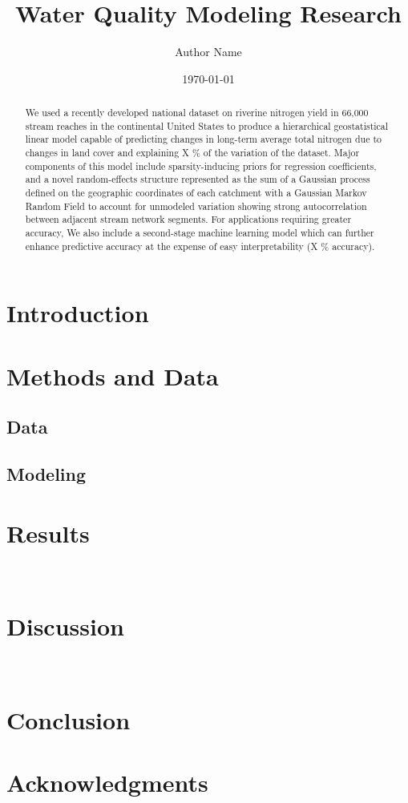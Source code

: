 \documentclass[12pt,letterpaper]{article}
\title{Water Quality Modeling Research}
\author{Author Name}
\date{\today}
\begin{document}
\maketitle

\begin{abstract}
    We used a recently developed national dataset on riverine nitrogen yield in 66,000 stream reaches in the continental United States to produce a hierarchical geostatistical linear model capable of predicting changes in long-term average total nitrogen due to changes in land cover and explaining X \% of the variation of the dataset. Major components of this model include sparsity-inducing priors for regression coefficients, and a novel random-effects structure represented as the sum of a Gaussian process defined on the geographic coordinates of each catchment with a Gaussian Markov Random Field to account for unmodeled variation showing strong autocorrelation between adjacent stream network segments. For applications requiring greater accuracy, We also include a second-stage machine learning model which can further enhance predictive accuracy at the expense of easy interpretability (X \% accuracy). 
\end{abstract}

\section{Introduction}
\label{sec:introduction}

\section{Methods and Data}
\label{sec:methods}

\subsection{Data}

\subsection{Modeling}

\section{Results}
\

\section{Discussion}
\
\section{Conclusion}
\label{sec:conclusion}


\section*{Acknowledgments}



\end{document}
